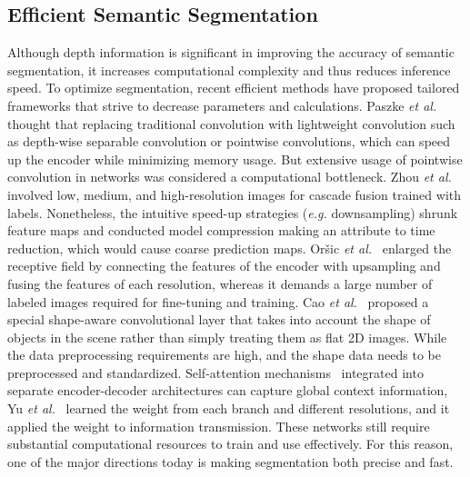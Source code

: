 \documentclass[journal,twoside,web]{ieeecolor}
\begin{document}
\subsection{Efficient Semantic Segmentation}
Although depth information is significant in improving the accuracy of semantic segmentation, it increases computational complexity and thus reduces inference speed. To optimize segmentation, recent efficient methods have proposed tailored frameworks that strive to decrease parameters and calculations. Paszke \textit{et al.}~\cite{ESPNetv2} thought that replacing traditional convolution with lightweight convolution such as depth-wise separable convolution or pointwise convolutions, which can speed up the encoder while minimizing memory usage. But extensive usage of pointwise convolution in networks was considered a computational bottleneck. Zhou \textit{et al.}~\cite{ICNet} involved low, medium, and high-resolution images for cascade fusion trained with labels. Nonetheless, the intuitive speed-up strategies (\textit{e.g.} downsampling) shrunk feature maps and conducted model compression making an attribute to time reduction,  which would cause coarse prediction maps.  Oršic \textit{et al.}~\cite{SwiftNet} enlarged the receptive field by connecting the features of the encoder with upsampling and fusing the features of each resolution, whereas it demands a large number of labeled images required for fine-tuning and training.
Cao \textit{et al.}~\cite{ ShapeConv } proposed a special shape-aware convolutional layer that takes into account the shape of objects in the scene rather than simply treating them as flat 2D images. While the data preprocessing requirements are high, and the shape data needs to be preprocessed and standardized. Self-attention mechanisms~\cite{TSNet} integrated into separate encoder-decoder architectures can capture global context information, Yu \textit{et al.}~\cite{Lite-HRNet} learned the weight from each branch and different resolutions, and it applied the weight to information transmission. These networks still require substantial computational resources to train and use effectively. For this reason, one of the major directions today is making segmentation both precise and fast.  
\end{document}
